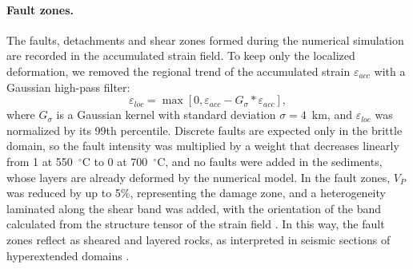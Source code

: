\paragraph{Fault zones.}
The faults, detachments and shear zones formed during the numerical simulation are recorded
in the accumulated strain field. To keep only the localized deformation, we removed the
regional trend of the accumulated strain $\varepsilon_{acc}$ with a Gaussian high-pass filter:
\begin{equation}
  \varepsilon_{loc} = \max\left[0, \varepsilon_{acc} - G_{\sigma} * \varepsilon_{acc}\right],
  \label{eq:localized_strain}
\end{equation}
where $G_{\sigma}$ is a Gaussian kernel with standard deviation $\sigma = 4$~km, and
$\varepsilon_{loc}$ was normalized by its 99th percentile. Discrete faults are expected only
in the brittle domain, so the fault intensity was multiplied by a weight that decreases
linearly from 1 at 550~$^\circ$C to 0 at 700~$^\circ$C, and no faults were added in the
sediments, whose layers are already deformed by the numerical model. In the fault zones,
$V_P$ was reduced by up to 5\%, representing the damage zone, and a heterogeneity laminated
along the shear band was added, with the orientation of the band calculated from the
structure tensor of the strain field \citep[e.g.][]{Fehmers2003}. In this way, the fault
zones reflect as sheared and layered rocks, as interpreted in seismic sections of
hyperextended domains \citep{Gillard2015, Gillard2016a}.


